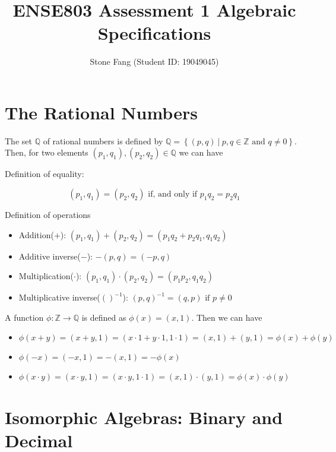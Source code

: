 \documentclass[
  a4paper,
]{article}
\title{ENSE803 Assessment 1 Algebraic Specifications}
\author{Stone Fang (Student ID: 19049045)}
\date{}
\begin{document}
\maketitle

\hypertarget{the-rational-numbers}{%
\section{The Rational Numbers}\label{the-rational-numbers}}

The set \(\mathbb{Q}\) of rational numbers is defined by
\(\mathbb{Q}= \left\{ (p, q)~|~p, q \in \mathbb{Z}\mbox{~and~} q \neq 0 \right\}\).
Then, for two elements \((p_1, q_1), (p_2, q_2) \in \mathbb{Q}\) we can
have

Definition of equality:

\[ (p_1, q_1) = (p_2, q_2) \mbox{~if, and only if~} p_1 q_2 = p_2 q_1 \]

Definition of operations

\begin{itemize}
\item
  Addition(\(+\)):
  \((p_1, q_1) + (p_2, q_2) = (p_1 q_2 + p_2 q_1, q_1 q_2)\)
\item
  Additive inverse(\(-\)): \(- (p, q) = (-p, q)\)
\item
  Multiplication(\(\cdot\)):
  \((p_1, q_1) \cdot (p_2, q_2) = (p_1 p_2, q_1 q_2)\)
\item
  Multiplicative inverse(\(()^{-1}\)):
  \((p, q)^{-1} = (q, p) \mbox{~if~} p \neq 0\)
\end{itemize}

A function \(\phi: \mathbb{Z}\rightarrow \mathbb{Q}\) is defined as
\(\phi(x) = (x, 1)\). Then we can have

\begin{itemize}
\item
  \(\phi(x+y) = (x+y, 1) = (x \cdot 1 + y \cdot 1, 1 \cdot 1) = (x, 1) + (y, 1) = \phi(x) + \phi(y)\)
\item
  \(\phi(-x) = (-x, 1) = -(x, 1) = -\phi(x)\)
\item
  \(\phi(x \cdot y) = (x \cdot y, 1) = (x \cdot y, 1 \cdot 1) = (x, 1) \cdot (y, 1) = \phi(x) \cdot \phi(y)\)
\end{itemize}

\hypertarget{isomorphic-algebras-binary-and-decimal}{%
\section{Isomorphic Algebras: Binary and
Decimal}\label{isomorphic-algebras-binary-and-decimal}}

\printbibliography[title=Formal methods in IT]
\end{document}
